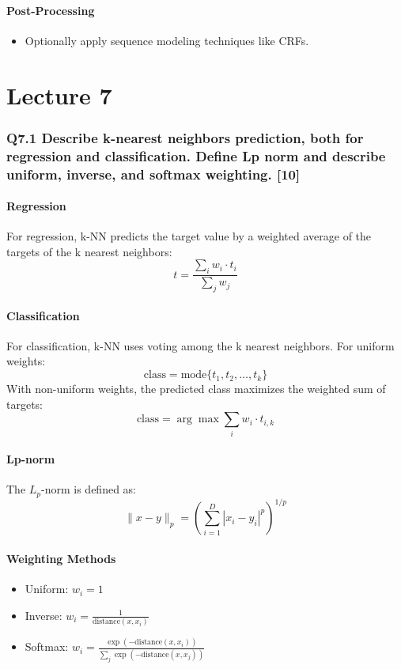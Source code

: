\documentclass[11pt]{article}
\begin{document}
\subsection*{Post-Processing}
\begin{itemize}
    \item Optionally apply sequence modeling techniques like CRFs.
\end{itemize}

\part{Lecture 7}

\section{Q7.1 Describe k-nearest neighbors prediction, both for regression and classification. Define Lp norm and describe uniform, inverse, and softmax weighting. [10]}

\subsection*{Regression}
For regression, k-NN predicts the target value by a weighted average of the targets of the k nearest neighbors:
\[ t = \frac{\sum_{i} w_i \cdot t_i}{\sum_{j} w_j} \]

\subsection*{Classification}
For classification, k-NN uses voting among the k nearest neighbors. For uniform weights:
\[ \text{class} = \text{mode}\{t_1, t_2, \ldots, t_k\} \]
With non-uniform weights, the predicted class maximizes the weighted sum of targets:
\[ \text{class} = \arg\max \sum_{i} w_i \cdot t_{i,k} \]

\subsection*{Lp-norm}
The \( L_p \)-norm is defined as:
\[ \lVert x - y \rVert_p = \left( \sum_{i=1}^{D} |x_i - y_i|^p \right)^{1/p} \]

\subsection*{Weighting Methods}
\begin{itemize}
    \item Uniform: \( w_i = 1 \)
    \item Inverse: \( w_i = \frac{1}{\text{distance}(x, x_i)} \)
    \item Softmax: \( w_i = \frac{\exp(-\text{distance}(x, x_i))}{\sum_j \exp(-\text{distance}(x, x_j))} \)
\end{itemize}
\end{document}
